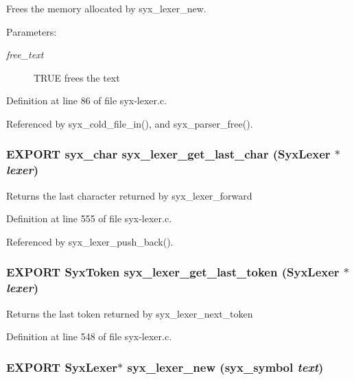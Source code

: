 Frees the memory allocated by syx\_\-lexer\_\-new.

\begin{Desc}
\item[Parameters:]
\begin{description}
\item[{\em free\_\-text}]TRUE frees the text \end{description}
\end{Desc}


Definition at line 86 of file syx-lexer.c.

Referenced by syx\_\-cold\_\-file\_\-in(), and syx\_\-parser\_\-free().\hypertarget{syx-lexer_8h_427fcf294782c171cf9e225cfce99881}{
\subsubsection{\setlength{\rightskip}{0pt plus 5cm}EXPORT {\bf syx\_\-char} syx\_\-lexer\_\-get\_\-last\_\-char ({\bf SyxLexer} $\ast$ {\em lexer})}}
\label{syx-lexer_8h_427fcf294782c171cf9e225cfce99881}


Returns the last character returned by syx\_\-lexer\_\-forward 

Definition at line 555 of file syx-lexer.c.

Referenced by syx\_\-lexer\_\-push\_\-back().\hypertarget{syx-lexer_8h_010af7219d1223881638a38172df9a06}{
\subsubsection{\setlength{\rightskip}{0pt plus 5cm}EXPORT {\bf SyxToken} syx\_\-lexer\_\-get\_\-last\_\-token ({\bf SyxLexer} $\ast$ {\em lexer})}}
\label{syx-lexer_8h_010af7219d1223881638a38172df9a06}


Returns the last token returned by syx\_\-lexer\_\-next\_\-token 

Definition at line 548 of file syx-lexer.c.\hypertarget{syx-lexer_8h_0550b17d25c07c2b437d37b380f3571d}{
\subsubsection{\setlength{\rightskip}{0pt plus 5cm}EXPORT {\bf SyxLexer}$\ast$ syx\_\-lexer\_\-new ({\bf syx\_\-symbol} {\em text})}}
\label{syx-lexer_8h_0550b17d25c07c2b437d37b380f3571d}


